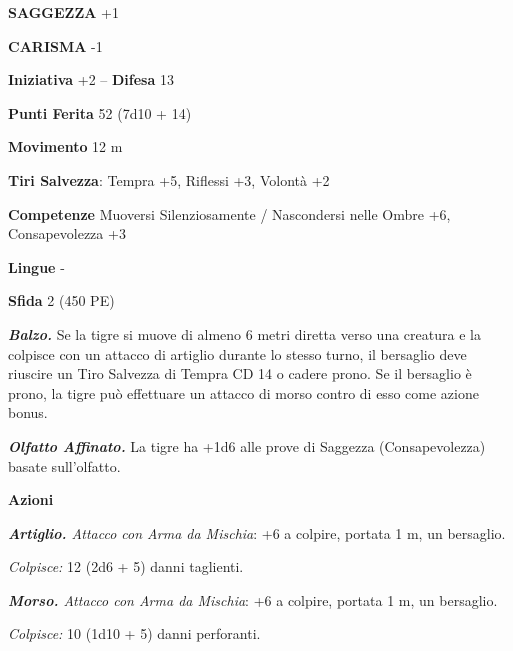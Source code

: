 \begin{multicols}{2}
\textbf{SAGGEZZA} +1

\textbf{CARISMA} -1

\textbf{Iniziativa} +2 -- \textbf{Difesa} 13

\textbf{Punti Ferita} 52 (7d10 + 14)

\textbf{Movimento} 12 m

\textbf{Tiri Salvezza}: Tempra +5, Riflessi +3, Volontà +2

\textbf{Competenze} Muoversi Silenziosamente / Nascondersi nelle Ombre +6, Consapevolezza +3

\textbf{Lingue} -

\textbf{Sfida} 2 (450 PE)

\emph{\textbf{Balzo.}} Se la tigre si muove di almeno 6 metri diretta verso una creatura e la colpisce con un attacco di artiglio durante lo stesso turno, il bersaglio deve riuscire un Tiro Salvezza di Tempra CD 14 o cadere prono. Se il bersaglio è prono, la tigre può effettuare un attacco di morso contro di esso come azione bonus.

\emph{\textbf{Olfatto Affinato.}} La tigre ha +1d6 alle prove di Saggezza (Consapevolezza) basate sull'olfatto.

\textbf{Azioni}

\emph{\textbf{Artiglio.} Attacco con Arma da Mischia}: +6 a colpire, portata 1 m, un bersaglio.

\emph{Colpisce:} 12 (2d6 + 5) danni taglienti.

\emph{\textbf{Morso.} Attacco con Arma da Mischia}: +6 a colpire, portata 1 m, un bersaglio.

\emph{Colpisce:} 10 (1d10 + 5) danni perforanti.


\end{multicols}
